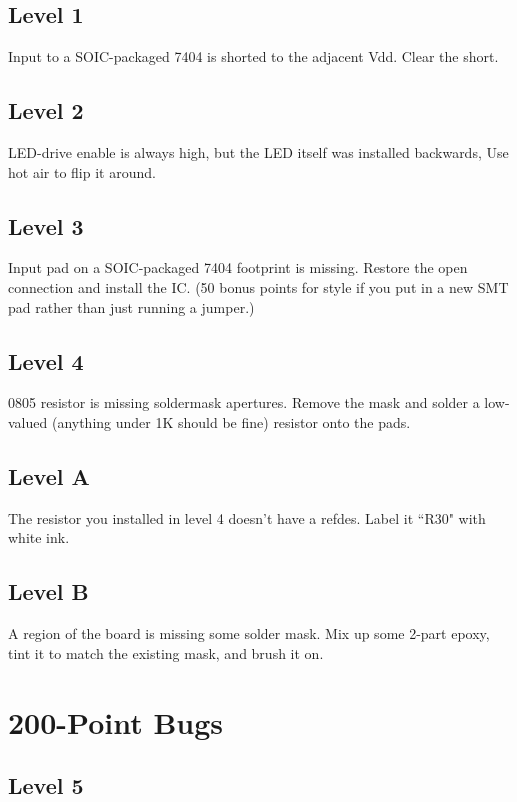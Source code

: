 \documentclass{article}
\begin{document}
\subsection{Level 1}

Input to a SOIC-packaged 7404 is shorted to the adjacent Vdd. Clear the short.

\subsection{Level 2}

LED-drive enable is always high, but the LED itself was installed backwards, Use hot air to flip it around.

\subsection{Level 3}

Input pad on a SOIC-packaged 7404 footprint is missing. Restore the open connection and install the IC. (50 bonus
points for style if you put in a new SMT pad rather than just running a jumper.)

\subsection{Level 4}

0805 resistor is missing soldermask apertures. Remove the mask and solder a low-valued (anything under 1K should be fine)
resistor onto the pads.

\subsection{Level A}

The resistor you installed in level 4 doesn't have a refdes. Label it ``R30" with white ink.

\subsection{Level B}

A region of the board is missing some solder mask. Mix up some 2-part epoxy, tint it to match the existing mask, and
brush it on.

\pagebreak
\section{200-Point Bugs}

\subsection{Level 5}
\end{document}
